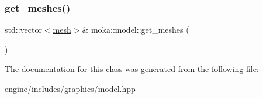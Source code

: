 \subsubsection{\texorpdfstring{get\_meshes()}{get\_meshes()}}
{\footnotesize\ttfamily std\+::vector$<$\mbox{\hyperlink{classmoka_1_1mesh}{mesh}}$>$\& moka\+::model\+::get\+\_\+meshes (\begin{DoxyParamCaption}{ }\end{DoxyParamCaption})}



The documentation for this class was generated from the following file\+:\begin{DoxyCompactItemize}
\item 
engine/includes/graphics/\mbox{\hyperlink{model_8hpp}{model.\+hpp}}\end{DoxyCompactItemize}
